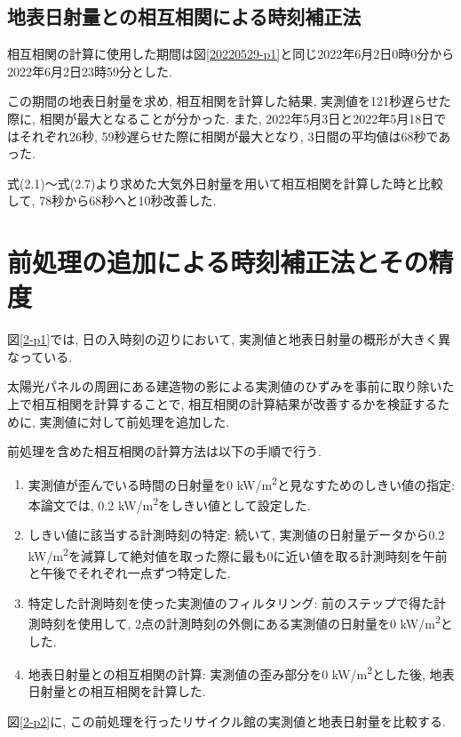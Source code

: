 \subsection{地表日射量との相互相関による時刻補正法}
相互相関の計算に使用した期間は図\ref{20220529-p1}と同じ2022年6月2日0時0分から2022年6月2日23時59分とした.

この期間の地表日射量を求め, 相互相関を計算した結果, 実測値を121秒遅らせた際に, 相関が最大となることが分かった.  また, 2022年5月3日と2022年5月18日ではそれぞれ26秒, 59秒遅らせた際に相関が最大となり, 3日間の平均値は68秒であった.

式(2.1)～式(2.7)より求めた大気外日射量を用いて相互相関を計算した時と比較して, 78秒から68秒へと10秒改善した.

\section{前処理の追加による時刻補正法とその精度}

図\ref{2-p1}では, 日の入時刻の辺りにおいて, 実測値と地表日射量の概形が大きく異なっている.

太陽光パネルの周囲にある建造物の影による実測値のひずみを事前に取り除いた上で相互相関を計算することで, 相互相関の計算結果が改善するかを検証するために, 実測値に対して前処理を追加した.

前処理を含めた相互相関の計算方法は以下の手順で行う.

\begin{enumerate}
  \item 実測値が歪んでいる時間の日射量を0 \si{\kilo\watt}/\si{\metre\squared}と見なすためのしきい値の指定: 本論文では, 0.2 \si{\kilo\watt}/\si{\metre\squared}をしきい値として設定した.
  \item しきい値に該当する計測時刻の特定: 続いて, 実測値の日射量データから0.2 \si{\kilo\watt}/\si{\metre\squared}を減算して絶対値を取った際に最も0に近い値を取る計測時刻を午前と午後でそれぞれ一点ずつ特定した.
  \item 特定した計測時刻を使った実測値のフィルタリング: 前のステップで得た計測時刻を使用して, 2点の計測時刻の外側にある実測値の日射量を0 \si{\kilo\watt}/\si{\metre\squared}とした.
  \item 地表日射量との相互相関の計算: 実測値の歪み部分を0 \si{\kilo\watt}/\si{\metre\squared}とした後, 地表日射量との相互相関を計算した.
\end{enumerate}

図\ref{2-p2}に, この前処理を行ったリサイクル館の実測値と地表日射量を比較する.

